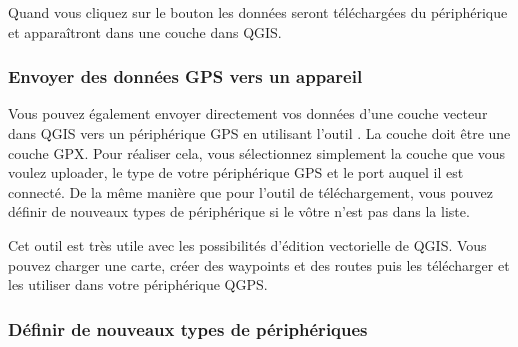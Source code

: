 Quand vous cliquez sur le bouton  les données seront téléchargées du
périphérique et apparaîtront dans une couche dans QGIS.

\subsubsection{Envoyer des données GPS vers un appareil}

Vous pouvez également envoyer directement vos données d'une couche vecteur 
dans QGIS vers un périphérique GPS en utilisant l'outil .
La couche doit être une couche GPX.
Pour réaliser cela, vous sélectionnez simplement la couche que vous voulez 
uploader, le type de votre périphérique GPS et le port auquel il est connecté.
De la même manière que pour l'outil de téléchargement, vous pouvez définir de 
nouveaux types de périphérique si le vôtre n'est pas dans la liste.

Cet outil est très utile avec les possibilités d'édition vectorielle de QGIS. 
Vous pouvez charger une carte, créer des waypoints et des routes puis les
télécharger et les utiliser dans votre périphérique QGPS.

\subsubsection{\label{sec:Defining-new-device}Définir de nouveaux types de périphériques}

